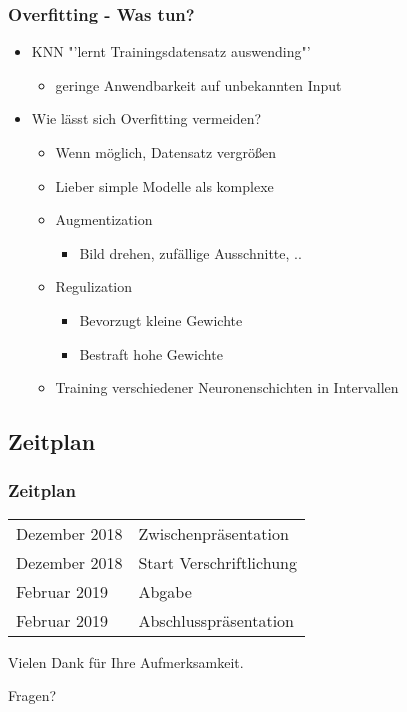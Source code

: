 \documentclass{beamer}
\begin{document}

\begin{frame}\frametitle{Overfitting - Was tun?}
\begin{itemize}
	\item KNN "'lernt Trainingsdatensatz auswending"'
	\begin{itemize}
		\item geringe Anwendbarkeit auf unbekannten Input
	\end{itemize}
	\item Wie lässt sich Overfitting vermeiden?
	\begin{itemize}
		\item Wenn möglich, Datensatz vergrößen
		\item Lieber simple Modelle als komplexe
		\item Augmentization
		\begin{itemize}
			\item Bild drehen, zufällige Ausschnitte, ..
		\end{itemize}
		\item Regulization
		\begin{itemize}
			\item Bevorzugt kleine Gewichte
			\item Bestraft hohe Gewichte
		\end{itemize}
		\item Training verschiedener Neuronenschichten in Intervallen
	\end{itemize}
\end{itemize}
\end{frame}


\begin{frame}\section{Zeitplan}\frametitle{Zeitplan}
\begin{tabular}{l l}
Dezember 2018 & Zwischenpräsentation\\
Dezember 2018 & Start Verschriftlichung\\
Februar 2019 & Abgabe\\
Februar 2019 & Abschlusspräsentation
\end{tabular}
\end{frame}


\begin{frame}
\centerline{Vielen Dank für Ihre Aufmerksamkeit.}
\Huge{\centerline{Fragen?}}
\end{frame}

\end{document}
